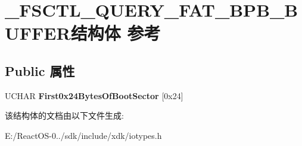 \hypertarget{struct___f_s_c_t_l___q_u_e_r_y___f_a_t___b_p_b___b_u_f_f_e_r}{}\section{\+\_\+\+F\+S\+C\+T\+L\+\_\+\+Q\+U\+E\+R\+Y\+\_\+\+F\+A\+T\+\_\+\+B\+P\+B\+\_\+\+B\+U\+F\+F\+E\+R结构体 参考}
\label{struct___f_s_c_t_l___q_u_e_r_y___f_a_t___b_p_b___b_u_f_f_e_r}
\subsection*{Public 属性}
\begin{DoxyCompactItemize}
\item 
\mbox{\label{struct___f_s_c_t_l___q_u_e_r_y___f_a_t___b_p_b___b_u_f_f_e_r_a8dd52c7680b7c1ab8378a1c81eb654d0}} 
U\+C\+H\+AR {\bfseries First0x24\+Bytes\+Of\+Boot\+Sector} \mbox{[}0x24\mbox{]}
\end{DoxyCompactItemize}


该结构体的文档由以下文件生成\+:\begin{DoxyCompactItemize}
\item 
E\+:/\+React\+O\+S-\/0../sdk/include/xdk/iotypes.\+h\end{DoxyCompactItemize}
